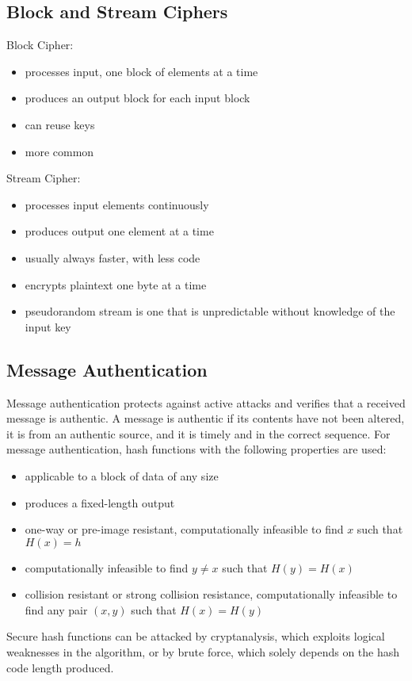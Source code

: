 \documentclass{math}
\begin{document}
\subsection*{Block and Stream Ciphers}
Block Cipher:
\begin{itemize}
  \item processes input, one block of elements at a time
  \item produces an output block for each input block
  \item can reuse keys
  \item more common
\end{itemize}
Stream Cipher:
\begin{itemize}
  \item processes input elements continuously
  \item produces output one element at a time
  \item usually always faster, with less code
  \item encrypts plaintext one byte at a time
  \item pseudorandom stream is one that is unpredictable without knowledge of
  the input key
\end{itemize}

\subsection*{Message Authentication}
Message authentication protects against active attacks and verifies that a
received message is authentic. A message is authentic if its contents have not
been altered, it is from an authentic source, and it is timely and in the
correct sequence. For message authentication, hash functions with the following
properties are used:
\begin{itemize}
  \item applicable to a block of data of any size
  \item produces a fixed-length output
  \item one-way or pre-image resistant, computationally infeasible to find
  \( x \) such that \( H(x) = h \)
  \item computationally infeasible to find \( y\ne x \) such that
  \( H(y) = H(x) \)
  \item collision resistant or strong collision resistance, computationally
  infeasible to find any pair \( (x,y) \) such that \( H(x) = H(y) \)
\end{itemize}
Secure hash functions can be attacked by cryptanalysis, which exploits
logical weaknesses in the algorithm, or by brute force, which solely depends
on the hash code length produced.
\end{document}
